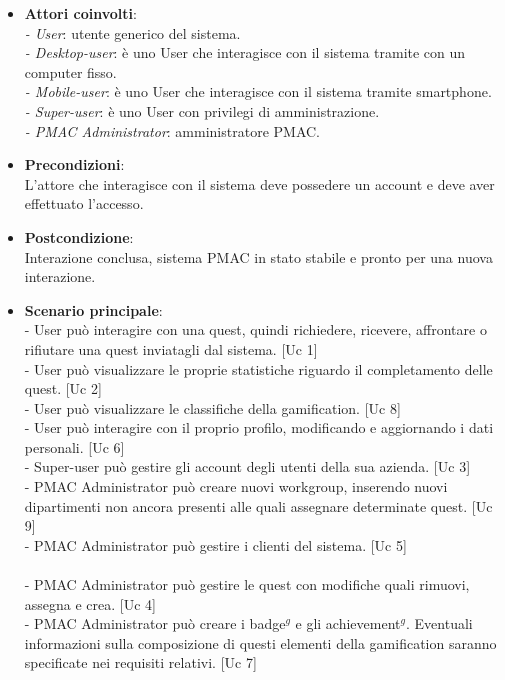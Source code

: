 {\begin{itemize}
\item \textbf{Attori coinvolti}:\\
\emph{- User}: utente generico del sistema.\\
\emph{- Desktop-user}: è uno User che interagisce con il sistema tramite con un computer fisso.\\
\emph{- Mobile-user}: è uno User che interagisce con il sistema tramite smartphone.\\
\emph{- Super-user}: è uno User con privilegi di amministrazione.\\
\emph{- PMAC Administrator}: amministratore PMAC.

\item \textbf{Precondizioni}:\\
L'attore che interagisce con il sistema deve possedere un account e deve aver effettuato l'accesso.

\item \textbf{Postcondizione}:\\
Interazione conclusa, sistema PMAC in stato stabile e pronto per una nuova interazione.

\item \textbf{Scenario principale}:\\
- User può interagire con una quest, quindi richiedere, ricevere, affrontare o rifiutare una quest inviatagli dal sistema. [Uc 1]\\
- User può visualizzare le proprie statistiche riguardo il completamento delle quest. [Uc 2]\\
- User può visualizzare le classifiche della gamification. [Uc 8]\\
- User può interagire con il proprio profilo, modificando e aggiornando i dati personali. [Uc 6]\\
- Super-user può gestire gli account degli utenti della sua azienda. [Uc 3]\\
- PMAC Administrator può creare nuovi workgroup, inserendo nuovi dipartimenti non ancora presenti alle quali assegnare determinate quest. [Uc 9]\\
- PMAC Administrator può gestire i clienti del sistema. [Uc 5]\\\\
- PMAC Administrator può gestire le quest con modifiche quali rimuovi, assegna e crea. [Uc 4]\\
- PMAC Administrator può creare i badge$^g$ e gli achievement$^g$. Eventuali informazioni sulla composizione di questi elementi della gamification saranno specificate nei requisiti relativi. [Uc 7]
\end{itemize}


}
